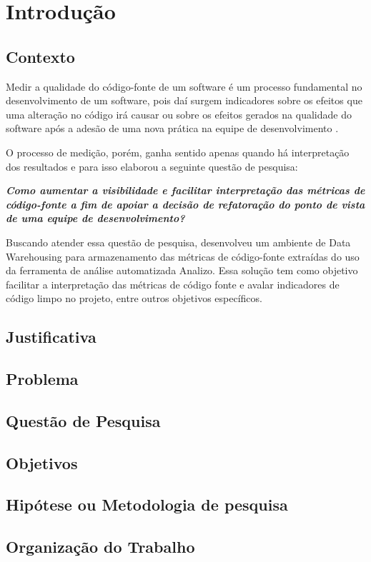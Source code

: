 \chapter{Introdução}

\section{Contexto}

Medir a qualidade do código-fonte  de um software é um processo fundamental no desenvolvimento de um software, pois daí surgem indicadores sobre os efeitos que uma alteração no código irá causar ou sobre os efeitos gerados na qualidade do software após a adesão de uma nova prática na equipe de desenvolvimento \cite{Fenton98}.

O processo de medição, porém, ganha sentido apenas quando há interpretação dos resultados e para isso  elaborou a seguinte questão de pesquisa: 

\textit{\textbf{Como aumentar a
visibilidade e facilitar interpretação das 
métricas de código-fonte
a fim de apoiar a decisão de refatoração
do ponto de vista de uma equipe de desenvolvimento?}}

Buscando atender essa questão de pesquisa,  desenvolveu um ambiente de Data Warehousing para armazenamento das métricas de código-fonte extraídas do uso da ferramenta de análise  automatizada Analizo. Essa solução tem como objetivo facilitar a interpretação das métricas de código fonte e avalar indicadores de código limpo no projeto, entre outros objetivos específicos.

\section{Justificativa}

\section{Problema}

\section{Questão de Pesquisa}

\section{Objetivos}

\section{Hipótese ou Metodologia de pesquisa}

\section{Organização do Trabalho}
